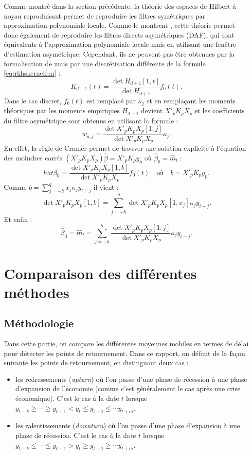 \documentclass[
  11pt,
  french,
  a4paper]{article}
\newcommand\1{\mathds{1}}
\begin{document}
Comme montré dans la section précédente, la théorie des espaces de Hilbert à noyau reproduisant permet de reproduire les filtres symétriques par approximation polynomiale locale.
Comme le montrent \textcite{LuatiProietti2011}, cette théorie permet donc également de reproduire les filtres directs asymétriques (DAF), qui sont équivalents à l'approximation polynomiale locale mais en utilisant une fenêtre d'estimation asymétrique.
Cependant, ils ne peuvent pas être obtenues par la formalisation de \textcite{dagumbianconcini2008} mais par une discrétisation différente de la formule \eqref{eq:rkhskernelfun} :
\[
K_{d+1}(t)=\frac{\det{H_{d+1}[1,t]}}{\det{H_{d+1}}}f_0(t).
\]
Dans le cas discret, \(f_0(t)\) est remplacé par \(\kappa_j\) et en remplaçant les moments théoriques par les moments empiriques \(H_{d+1}\) devient \(X'_pK_pX_p\) et les coefficients du filtre asymétrique sont obtenus en utilisant la formule :
\[
w_{a,j}=\frac{\det{X'_pK_pX_p[1,j]}
}{
\det{X'_pK_pX_p}
}\kappa_j.
\]
En effet, la règle de Cramer permet de trouver une solution explicite à l'équation des moindres carrés \((X'_pK_pX_p)\hat \beta=X'_pK_py_p\) où \(\hat \beta_0=\hat m_t\) :
\[
hat \beta_0 = \frac{\det{X'_pK_pX_p[1,b]}}{\det{X'_pK_pX_p}}f_0(t)
\quad\text{où}\quad b=X'_pK_py_p.
\]
Comme \(b=\sum_{j=-h}^qx_j\kappa_jy_{t+j}\) il vient :
\[
\det{X'_pK_pX_p[1,b]} = \sum_{j=-h}^q\det{X'_pK_pX_p[1,x_j]}\kappa_jy_{t+j}.
\]
Et enfin :
\[
\hat \beta_0 = \hat m_t= \sum_{j=-h}^q\frac{\det{X'_pK_pX_p[1,j]}
}{
\det{X'_pK_pX_p}
}\kappa_j y_{t+j}.
\]

\hypertarget{sec-comparison}{%
\section{Comparaison des différentes méthodes}\label{sec-comparison}}

\hypertarget{muxe9thodologie}{%
\subsection{Méthodologie}\label{muxe9thodologie}}

Dans cette partie, on compare les différentes moyennes mobiles en termes de délai pour détecter les points de retournement.
Dans ce rapport, on définit de la façon suivante les points de retournement, en distinguant deux cas :

\begin{itemize}
\item
  les redressements (\emph{upturn}) où l'on passe d'une phase de récession à une phase d'expansion de l'économie (comme c'est généralement le cas après une crise économique).
  C'est le cas à la date \(t\) lorsque \(y_{t-k}\geq\cdots\geq y_{t-1}<y_t\leq y_{t+1}\leq\cdots y_{t+m}\).
\item
  les ralentissements (\emph{downturn}) où l'on passe d'une phase d'expansion à une phase de récession.
  C'est le cas à la date \(t\) lorsque \(y_{t-k}\leq\cdots\leq y_{t-1}>y_t\geq y_{t+1}\geq\cdots y_{t+m}\).
\end{itemize}
\end{document}
